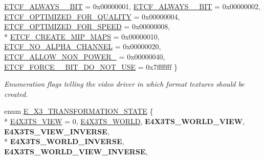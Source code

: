 \begin{DoxyCompactItemize}
\hyperlink{namespaceirr_1_1video_acaf6f7414534f7d62bff18c5bf11876fa4fe1c1b0f4b44ef4b5da219ce66a0ae8}{E\+T\+C\+F\+\_\+\+A\+L\+W\+A\+Y\+S\+\_\+\_\+\+B\+IT} = 0x00000001, 
\hyperlink{namespaceirr_1_1video_acaf6f7414534f7d62bff18c5bf11876fa20881e307a778c4a4fbb5327a60a93bb}{E\+T\+C\+F\+\_\+\+A\+L\+W\+A\+Y\+S\+\_\+\_\+\+B\+IT} = 0x00000002, 
\hyperlink{namespaceirr_1_1video_acaf6f7414534f7d62bff18c5bf11876fadc5336eb55e0221ef0d7e53c1cf5a2b9}{E\+T\+C\+F\+\_\+\+O\+P\+T\+I\+M\+I\+Z\+E\+D\+\_\+\+F\+O\+R\+\_\+\+Q\+U\+A\+L\+I\+TY} = 0x00000004, 
\hyperlink{namespaceirr_1_1video_acaf6f7414534f7d62bff18c5bf11876fa01693eaffcfeca7de6fcd7e826a909c3}{E\+T\+C\+F\+\_\+\+O\+P\+T\+I\+M\+I\+Z\+E\+D\+\_\+\+F\+O\+R\+\_\+\+S\+P\+E\+ED} = 0x00000008, 
\\*
\hyperlink{namespaceirr_1_1video_acaf6f7414534f7d62bff18c5bf11876fa288b302e9d4faaba80c7796c7bc1682c}{E\+T\+C\+F\+\_\+\+C\+R\+E\+A\+T\+E\+\_\+\+M\+I\+P\+\_\+\+M\+A\+PS} = 0x00000010, 
\hyperlink{namespaceirr_1_1video_acaf6f7414534f7d62bff18c5bf11876fab9ce08dff03ebff9139b594610561609}{E\+T\+C\+F\+\_\+\+N\+O\+\_\+\+A\+L\+P\+H\+A\+\_\+\+C\+H\+A\+N\+N\+EL} = 0x00000020, 
\hyperlink{namespaceirr_1_1video_acaf6f7414534f7d62bff18c5bf11876fa6a834e40d35e01205ab63f3ce6d71172}{E\+T\+C\+F\+\_\+\+A\+L\+L\+O\+W\+\_\+\+N\+O\+N\+\_\+\+P\+O\+W\+E\+R\+\_} = 0x00000040, 
\hyperlink{namespaceirr_1_1video_acaf6f7414534f7d62bff18c5bf11876fa0081685b8fa033d771f9c6a5bded8253}{E\+T\+C\+F\+\_\+\+F\+O\+R\+C\+E\+\_\+\_\+\+B\+I\+T\+\_\+\+D\+O\+\_\+\+N\+O\+T\+\_\+\+U\+SE} = 0x7fffffff
 \}\begin{DoxyCompactList}\small\item\em Enumeration flags telling the video driver in which format textures should be created. \end{DoxyCompactList}
\item 
enum \hyperlink{namespaceirr_1_1video_a9f34b0dd7b888c8cbabb22989f23b853}{E\+\_\+X3\+\_\+\+T\+R\+A\+N\+S\+F\+O\+R\+M\+A\+T\+I\+O\+N\+\_\+\+S\+T\+A\+TE} \{ \\*
\hyperlink{namespaceirr_1_1video_a9f34b0dd7b888c8cbabb22989f23b853a6b3cdacd3de582697af3c99519ca49e4}{E4\+X3\+T\+S\+\_\+\+V\+I\+EW} = 0, 
\hyperlink{namespaceirr_1_1video_a9f34b0dd7b888c8cbabb22989f23b853a9e2da71dc29e91d31f7be3ce1ea1f377}{E4\+X3\+T\+S\+\_\+\+W\+O\+R\+LD}, 
{\bfseries E4\+X3\+T\+S\+\_\+\+W\+O\+R\+L\+D\+\_\+\+V\+I\+EW}, 
{\bfseries E4\+X3\+T\+S\+\_\+\+V\+I\+E\+W\+\_\+\+I\+N\+V\+E\+R\+SE}, 
\\*
{\bfseries E4\+X3\+T\+S\+\_\+\+W\+O\+R\+L\+D\+\_\+\+I\+N\+V\+E\+R\+SE}, 
{\bfseries E4\+X3\+T\+S\+\_\+\+W\+O\+R\+L\+D\+\_\+\+V\+I\+E\+W\+\_\+\+I\+N\+V\+E\+R\+SE}, 

\end{DoxyCompactItemize}
